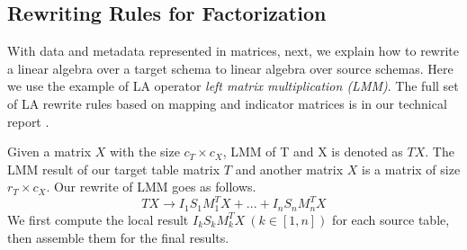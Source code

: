 \subsection{Rewriting Rules for Factorization }
\label{s:operations}
With data and metadata represented in matrices, next, we explain how to rewrite a linear algebra over a target schema to linear algebra over source schemas. 
Here we use the example of LA operator \emph{left matrix multiplication (LMM)}. 
The full set of LA rewrite rules based on mapping and indicator matrices is in our technical report \cite{tech}. 



 Given a matrix $X$ with the size $c_T \times c_X$, LMM of T and X is denoted as $TX$.  The  LMM result of our target table matrix $T$ and another matrix $X$ is a matrix of size $r_T \times c_X$. Our rewrite of LMM goes as follows.
\[
TX \rightarrow  I_1 S_1 M_1^T X + ... + I_n S_n M_n^T X
\]
We first compute the local result  $I_{k} S_k M_k^{T}X\ (k\in [1, n])$ for each source table, 
then assemble them for the final results.

%


